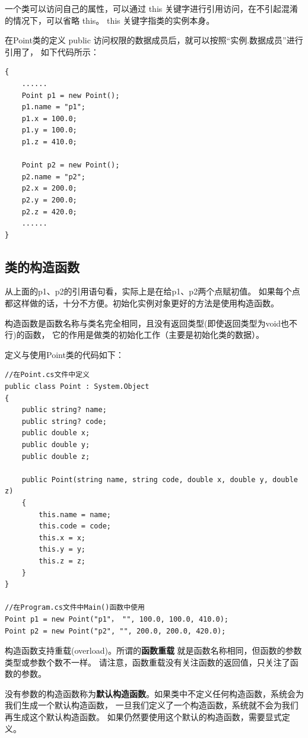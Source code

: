 一个类可以访问自己的属性，可以通过 this 关键字进行引用访问，在不引起混淆的情况下，可以省略 this。
this 关键字指类的实例本身。

在Point类的定义 public 访问权限的数据成员后，就可以按照``实例.数据成员''进行引用了，
如下代码所示：

\begin{lstlisting}
{
    ......
    Point p1 = new Point();
    p1.name = "p1";
    p1.x = 100.0;
    p1.y = 100.0;
    p1.z = 410.0;

    Point p2 = new Point();
    p2.name = "p2";
    p2.x = 200.0;
    p2.y = 200.0;
    p2.z = 420.0;
    ......
}
\end{lstlisting}

\subsection{类的构造函数}

从上面的p1、p2的引用语句看，实际上是在给p1、p2两个点赋初值。
如果每个点都这样做的话，十分不方便。初始化实例对象更好的方法是使用构造函数。

{ \heiti 构造函数是函数名称与类名完全相同，且没有返回类型(即使返回类型为void也不行)的函数，
它的作用是做类的初始化工作（主要是初始化类的数据）。 }

定义与使用Point类的代码如下：
\begin{lstlisting}
//在Point.cs文件中定义
public class Point : System.Object
{
    public string? name;
    public string? code;
    public double x;
    public double y;
    public double z;

    public Point(string name, string code, double x, double y, double z)
    {
        this.name = name;
        this.code = code;
        this.x = x;
        this.y = y;
        this.z = z;
    }
}

//在Program.cs文件中Main()函数中使用
Point p1 = new Point("p1"， "", 100.0, 100.0, 410.0);
Point p2 = new Point("p2", "", 200.0, 200.0, 420.0);
\end{lstlisting}

构造函数支持重载(overload)。所谓的\textbf{函数重载} 就是函数名称相同，但函数的参数类型或参数个数不一样。
请注意，函数重载没有关注函数的返回值，只关注了函数的参数。

没有参数的构造函数称为\textbf{默认构造函数}。如果类中不定义任何构造函数，系统会为我们生成一个默认构造函数，
一旦我们定义了一个构造函数，系统就不会为我们再生成这个默认构造函数。
如果仍然要使用这个默认的构造函数，需要显式定义。

